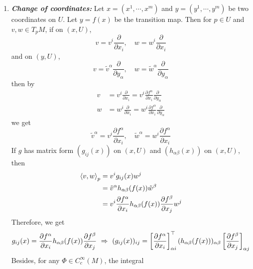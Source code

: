 \begin{enumerate}[label=\arabic{*}.]
	\item {\emph{\textbf{Change of coordinates:}}} Let $x=(x^1,\cdots,x^m)$ and $y=(y^1,\cdots,y^m)$ be two coordinates on $U$. Let $y = f(x)$ be the transition map. Then for $p \in U$ and $v,w \in T_pM$, if on $(x,U)$,
	\begin{equation*}
		v = v^i\frac{\partial}{\partial x_i},\quad w = w^i\frac{\partial}{\partial x_i}
	\end{equation*}
	and on $(y,U)$,
	\begin{equation*}
		v = \tilde{v}^\alpha\frac{\partial}{\partial y_\alpha},\quad w = \tilde{w}^\alpha\frac{\partial}{\partial y_\alpha}
	\end{equation*}
	then by
	\begin{equation*}
		\begin{aligned}
			v &= v^i\frac{\partial}{\partial x_i} = v^i\frac{\partial f^\alpha}{\partial x_i}\frac{\partial}{\partial y_\alpha}\\
			w &= w^i\frac{\partial}{\partial x_i} = w^i\frac{\partial f^\alpha}{\partial x_i}\frac{\partial}{\partial y_\alpha}
		\end{aligned}
	\end{equation*}
	we get
	\begin{equation*}
		\tilde{v}^\alpha = v^i\frac{\partial f^\alpha}{\partial x_i},\quad \tilde{w}^\alpha = w^i\frac{\partial f^\alpha}{\partial x_i}
	\end{equation*}
	If $g$ has matrix form $(g_{ij}(x))$ on $(x,U)$ and $(h_{\alpha \beta}(x))$ on $(x,U)$, then
	\begin{equation*}
		\begin{aligned}
			\left\langle v,w \right\rangle_p &= v^ig_{ij}(x)w^j \\
			&= \tilde{v}^\alpha h_{\alpha \beta}(f(x))\tilde{w}^\beta \\
			&= v^i\frac{\partial f^\alpha}{\partial x_i}h_{\alpha \beta}(f(x))\frac{\partial f^\beta}{\partial x_j}w^j
		\end{aligned}
	\end{equation*}
	Therefore, we get
	\begin{equation*}
		g_{ij}(x) = \frac{\partial f^\alpha}{\partial x_i}h_{\alpha \beta}(f(x))\frac{\partial f^\beta}{\partial x_j}~\Rightarrow~ (g_{ij}(x))_{ij} = \left[\frac{\partial f^\alpha}{\partial x_i}\right]^{\top}_{\alpha i}(h_{\alpha \beta}(f(x)))_{\alpha \beta}\left[\frac{\partial f^\beta}{\partial x_j}\right]_{\alpha j}
	\end{equation*}
	Besides, for any $\Phi \in C_c^\infty(M)$, the integral
	\begin{equation*}

\end{equation*}
\end{enumerate}
